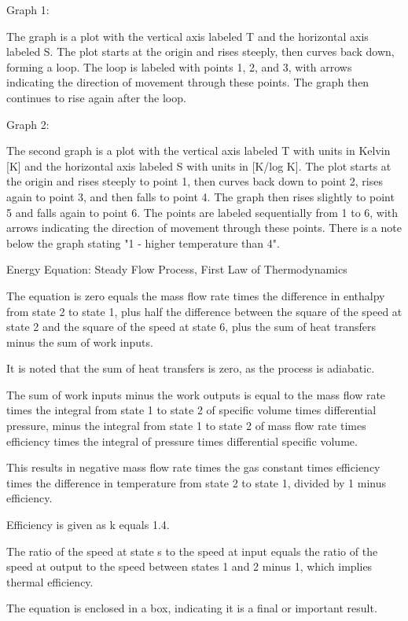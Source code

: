 Graph 1:

The graph is a plot with the vertical axis labeled T and the horizontal axis labeled S. The plot starts at the origin and rises steeply, then curves back down, forming a loop. The loop is labeled with points 1, 2, and 3, with arrows indicating the direction of movement through these points. The graph then continues to rise again after the loop.

Graph 2:

The second graph is a plot with the vertical axis labeled T with units in Kelvin [K] and the horizontal axis labeled S with units in [K/log K]. The plot starts at the origin and rises steeply to point 1, then curves back down to point 2, rises again to point 3, and then falls to point 4. The graph then rises slightly to point 5 and falls again to point 6. The points are labeled sequentially from 1 to 6, with arrows indicating the direction of movement through these points. There is a note below the graph stating "1 - higher temperature than 4".

Energy Equation: Steady Flow Process, First Law of Thermodynamics

The equation is zero equals the mass flow rate times the difference in enthalpy from state 2 to state 1, plus half the difference between the square of the speed at state 2 and the square of the speed at state 6, plus the sum of heat transfers minus the sum of work inputs.

It is noted that the sum of heat transfers is zero, as the process is adiabatic.

The sum of work inputs minus the work outputs is equal to the mass flow rate times the integral from state 1 to state 2 of specific volume times differential pressure, minus the integral from state 1 to state 2 of mass flow rate times efficiency times the integral of pressure times differential specific volume.

This results in negative mass flow rate times the gas constant times efficiency times the difference in temperature from state 2 to state 1, divided by 1 minus efficiency.

Efficiency is given as k equals 1.4.

The ratio of the speed at state s to the speed at input equals the ratio of the speed at output to the speed between states 1 and 2 minus 1, which implies thermal efficiency.

The equation is enclosed in a box, indicating it is a final or important result.